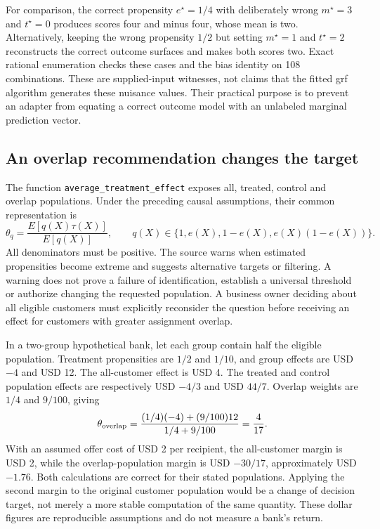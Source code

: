 For comparison, the correct propensity $e^\star=1/4$ with deliberately wrong $m^\star=3$ and $t^\star=0$ produces scores four and minus four, whose mean is two. Alternatively, keeping the wrong propensity $1/2$ but setting $m^\star=1$ and $t^\star=2$ reconstructs the correct outcome surfaces and makes both scores two. Exact rational enumeration checks these cases and the bias identity on 108 combinations. These are supplied-input witnesses, not claims that the fitted grf algorithm generates these nuisance values. Their practical purpose is to prevent an adapter from equating a correct outcome model with an unlabeled marginal prediction vector.~\citep{exec21_grf_reference}

\subsection{An overlap recommendation changes the target}
\label{exec21:grfr-target}
The function \texttt{average\_treatment\_effect} exposes all, treated, control and overlap populations. Under the preceding causal assumptions, their common representation is
\begin{equation}
 \theta_q=\frac{E[q(X)\tau(X)]}{E[q(X)]},\qquad
 q(X)\in\{1,e(X),1-e(X),e(X)(1-e(X))\}.
 \label{exec21:grfr-populations}
\end{equation}
All denominators must be positive. The source warns when estimated propensities become extreme and suggests alternative targets or filtering. A warning does not prove a failure of identification, establish a universal threshold or authorize changing the requested population. A business owner deciding about all eligible customers must explicitly reconsider the question before receiving an effect for customers with greater assignment overlap.~\citep{exec21_grf_reuse}

In a two-group hypothetical bank, let each group contain half the eligible population. Treatment propensities are $1/2$ and $1/10$, and group effects are USD $-4$ and USD 12. The all-customer effect is USD 4. The treated and control population effects are respectively USD $-4/3$ and USD $44/7$. Overlap weights are $1/4$ and $9/100$, giving
\begin{equation}
 \theta_{\rm overlap}
 =\frac{(1/4)(-4)+(9/100)12}{1/4+9/100}
 =\frac{4}{17}.
 \label{exec21:grfr-overlap}
\end{equation}
With an assumed offer cost of USD 2 per recipient, the all-customer margin is USD 2, while the overlap-population margin is USD $-30/17$, approximately USD $-1.76$. Both calculations are correct for their stated populations. Applying the second margin to the original customer population would be a change of decision target, not merely a more stable computation of the same quantity. These dollar figures are reproducible assumptions and do not measure a bank's return.~\citep{exec21_grf_reference}

